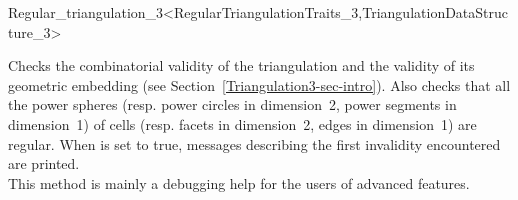 \begin{ccRefClass}{Regular_triangulation_3<RegularTriangulationTraits_3,TriangulationDataStructure_3>}
\begin{ccAdvanced}
{Checks the combinatorial validity of the triangulation and the
validity of its geometric embedding (see
Section~\ref{Triangulation3-sec-intro}). Also checks that all the
power spheres (resp. power circles in dimension~2, power segments in
dimension~1) of cells (resp. facets in dimension~2, edges in
dimension~1) are regular. When 
is set to true, messages describing the first invalidity encountered
are printed.\\ This method is mainly a debugging help for the users of
advanced features.
}

\end{ccAdvanced}




\end{ccRefClass}
